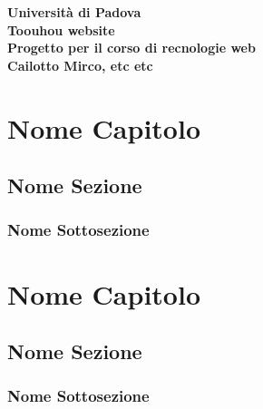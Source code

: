 \documentclass[openany, a4paper, 12pt]{report}
\begin{document}
	
	\begin{titlepage}
		\centering
		\vfill
		{
			\bfseries
			\vskip2cm
			\Large Università di Padova\\
			\vfill
			\Huge Toouhou website\\
			\Large Progetto per il corso di recnologie web\\
			\vfill
			\large Cailotto Mirco, etc etc\\
			\vfill
		}    
	\end{titlepage}
	\tableofcontents
	\newpage
	
	\chapter{Nome Capitolo}
	\section{Nome Sezione}
	\subsection{Nome Sottosezione}
	
	\chapter{Nome Capitolo}
	\section{Nome Sezione}
	\subsection{Nome Sottosezione}
	
	
\end{document}
